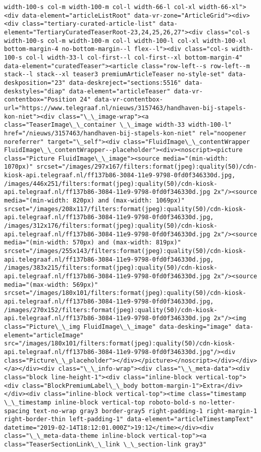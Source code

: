 \documentclass[11pt]{article}
\begin{document}
\begin{Verbatim}[commandchars=\\\{\}]
width-100-s col-m width-100-m col-l width-66-l col-xl width-66-xl"><div data-element="articleListRoot" data-vr-zone="ArticleGrid"><div><div class="tertiary-curated-article-list" data-element="TertiaryCuratedTeaserRoot-23,24,25,26,27"><div class="col-s width-100-s col-m width-100-m col-l width-100-l col-xl width-100-xl bottom-margin-4 no-bottom-margin--l flex--l"><div class="col-s width-100-s col-l width-33-l col-first--l col-first--xl bottom-margin-4" data-element="curatedTeaser"><article class="row-left--s row-left--m stack--l stack--xl teaser3 premiumArticleTeaser no-style-set" data-deskposition="23" data-deskreject="sections:5516" data-deskstyles="diap" data-element="articleTeaser" data-vr-contentbox="Position 24" data-vr-contentbox-url="https://www.telegraaf.nl/nieuws/3157463/handhaven-bij-stapels-kon-niet"><div class="\_\_image-wrap"><a class="TeaserImage\_\_container \_\_image width-33 width-100-l" href="/nieuws/3157463/handhaven-bij-stapels-kon-niet" rel="noopener noreferrer" target="\_self"><div class="FluidImage\_\_contentWrapper FluidImage\_\_contentWrapper--placeholder"><div><noscript><picture class="Picture FluidImage\_\_image"><source media="(min-width: 1070px)" srcset="/images/297x167/filters:format(jpeg):quality(50)/cdn-kiosk-api.telegraaf.nl/ff137b86-3084-11e9-9798-0fd0f346330d.jpg, /images/446x251/filters:format(jpeg):quality(50)/cdn-kiosk-api.telegraaf.nl/ff137b86-3084-11e9-9798-0fd0f346330d.jpg 2x"/><source media="(min-width: 820px) and (max-width: 1069px)" srcset="/images/208x117/filters:format(jpeg):quality(50)/cdn-kiosk-api.telegraaf.nl/ff137b86-3084-11e9-9798-0fd0f346330d.jpg, /images/312x176/filters:format(jpeg):quality(50)/cdn-kiosk-api.telegraaf.nl/ff137b86-3084-11e9-9798-0fd0f346330d.jpg 2x"/><source media="(min-width: 570px) and (max-width: 819px)" srcset="/images/255x143/filters:format(jpeg):quality(50)/cdn-kiosk-api.telegraaf.nl/ff137b86-3084-11e9-9798-0fd0f346330d.jpg, /images/383x215/filters:format(jpeg):quality(50)/cdn-kiosk-api.telegraaf.nl/ff137b86-3084-11e9-9798-0fd0f346330d.jpg 2x"/><source media="(max-width: 569px)" srcset="/images/180x101/filters:format(jpeg):quality(50)/cdn-kiosk-api.telegraaf.nl/ff137b86-3084-11e9-9798-0fd0f346330d.jpg, /images/270x152/filters:format(jpeg):quality(50)/cdn-kiosk-api.telegraaf.nl/ff137b86-3084-11e9-9798-0fd0f346330d.jpg 2x"/><img class="Picture\_\_img FluidImage\_\_image" data-desking="image" data-element="articleImage" src="/images/180x101/filters:format(jpeg):quality(50)/cdn-kiosk-api.telegraaf.nl/ff137b86-3084-11e9-9798-0fd0f346330d.jpg"/><div class="Picture\_\_placeholder"></div></picture></noscript></div></div></a></div><div class="\_\_info-wrap"><div class="\_\_meta-data"><div class="block line-height-1"><div class="inline-block vertical-top"><div class="BlockPremiumLabel\_\_body bottom-margin-1">Extra</div></div><div class="inline-block vertical-top"><time class="timestamp \_\_timestamp inline-block vertical-top roboto-bold-s no-letter-spacing text-no-wrap gray3 border-gray5 right-padding-1 right-margin-1 right-border-thin left-padding-1" data-element="articleTimestampText" datetime="2019-02-14T18:12:01.000Z">19:12</time></div><div class="\_\_meta-data-theme inline-block vertical-top"><a class="TeaserSectionLink\_\_link \_\_section-link gray3" 
\end{Verbatim}
\end{document}
